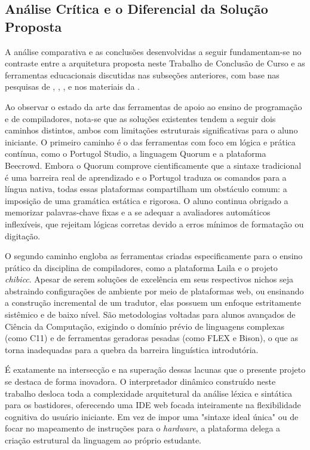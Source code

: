 \subsection{Análise Crítica e o Diferencial da Solução Proposta}

A análise comparativa e as conclusões desenvolvidas a seguir fundamentam-se no contraste entre a arquitetura proposta neste Trabalho de Conclusão de Curso e as ferramentas educacionais discutidas nas subseções anteriores, com base nas pesquisas de , , ,  e nos materiais da .

Ao observar o estado da arte das ferramentas de apoio ao ensino de programação e de compiladores, nota-se que as soluções existentes tendem a seguir dois caminhos distintos, ambos com limitações estruturais significativas para o aluno iniciante. O primeiro caminho é o das ferramentas com foco em lógica e prática contínua, como o Portugol Studio, a linguagem Quorum e a plataforma Beecrowd. Embora o Quorum comprove cientificamente que a sintaxe tradicional é uma barreira real de aprendizado e o Portugol traduza os comandos para a língua nativa, todas essas plataformas compartilham um obstáculo comum: a imposição de uma gramática estática e rigorosa. O aluno continua obrigado a memorizar palavras-chave fixas e a se adequar a avaliadores automáticos inflexíveis, que rejeitam lógicas corretas devido a erros mínimos de formatação ou digitação.

O segundo caminho engloba as ferramentas criadas especificamente para o ensino prático da disciplina de compiladores, como a plataforma Laila e o projeto \textit{chibicc}. Apesar de serem soluções de excelência em seus respectivos nichos seja abstraindo configurações de ambiente por meio de plataformas web, ou ensinando a construção incremental de um tradutor, elas possuem um enfoque estritamente sistêmico e de baixo nível. São metodologias voltadas para alunos avançados de Ciência da Computação, exigindo o domínio prévio de linguagens complexas (como C11) e de ferramentas geradoras pesadas (como FLEX e Bison), o que as torna inadequadas para a quebra da barreira linguística introdutória.

É exatamente na intersecção e na superação dessas lacunas que o presente projeto se destaca de forma inovadora. O interpretador dinâmico construído neste trabalho desloca toda a complexidade arquitetural da análise léxica e sintática para os bastidores, oferecendo uma IDE web focada inteiramente na flexibilidade cognitiva do usuário iniciante. Em vez de impor uma "sintaxe ideal única" ou de focar no mapeamento de instruções para o \textit{hardware}, a plataforma delega a criação estrutural da linguagem ao próprio estudante.

